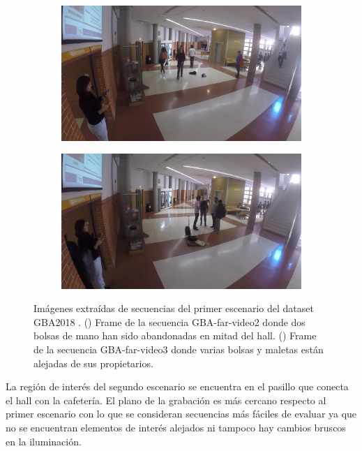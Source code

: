 \begin{figure}[ht!]
  \centering
  \begin{subfigure}[b]{0.4\textwidth}
    \includegraphics[width=\textwidth]{img/chapters/resultados/datasets/GBA_1.jpg}
    \caption{}
    \label{fig:GBA_1}
  \end{subfigure}
  \qquad\qquad
  \begin{subfigure}[b]{0.4\textwidth}
    \includegraphics[width=\textwidth]{img/chapters/resultados/datasets/GBA_2.jpg}
    \caption{}
    \label{fig:GBA_2}
  \end{subfigure}
  \caption{Imágenes extraídas de secuencias del primer escenario del dataset GBA2018 \cite{gba-dataset}.
    (\protect{}) Frame de la secuencia GBA-far-video2 donde dos bolsas de mano han sido abandonadas en mitad del hall.
    (\protect{}) Frame de la secuencia GBA-far-video3 donde varias bolsas y maletas están alejadas de sus propietarios.}
  \label{fig:GBA1}
\end{figure}

La región de interés del segundo escenario se encuentra en el pasillo que conecta el hall con la cafetería. El plano de la grabación es más cercano respecto al primer escenario con lo que se consideran secuencias más fáciles de evaluar ya que no se encuentran elementos de interés alejados ni tampoco hay cambios bruscos en la iluminación.


